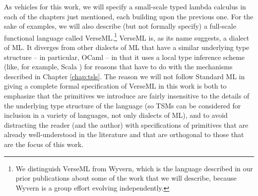 As vehicles for this work, we will specify a small-scale typed lambda calculus in each of the chapters just mentioned, each building upon the previous one. For the sake of examples, we will also describe (but not formally specify) a full-scale functional language called VerseML.\footnote{We distinguish VerseML from Wyvern, which is the language described in our prior publications about some of the work that we will describe, because Wyvern is a group effort evolving independently.} VerseML is, as its name suggests, a dialect of ML. It diverges from other dialects of ML that have a similar underlying type structure -- in particular, OCaml -- in that it uses a local type inference scheme \cite{Pierce:2000:LTI:345099.345100} (like, for example, Scala \cite{OdeZenZen01}) for reasons that have to do with the mechanisms described in Chapter \ref{chap:tsls}. The reason we will not follow Standard ML \cite{mthm97-for-dart} in giving a complete formal specification of VerseML in this work is both to emphasize that the primitives we introduce are fairly insensitive to the details of the underlying type structure of the language (so TSMs can be considered for inclusion in a variety of languages, not only dialects of ML), and to avoid distracting the reader (and the author) with specifications of primitives that are already well-understood in the literature and that are orthogonal to those that are the focus of this work. %



